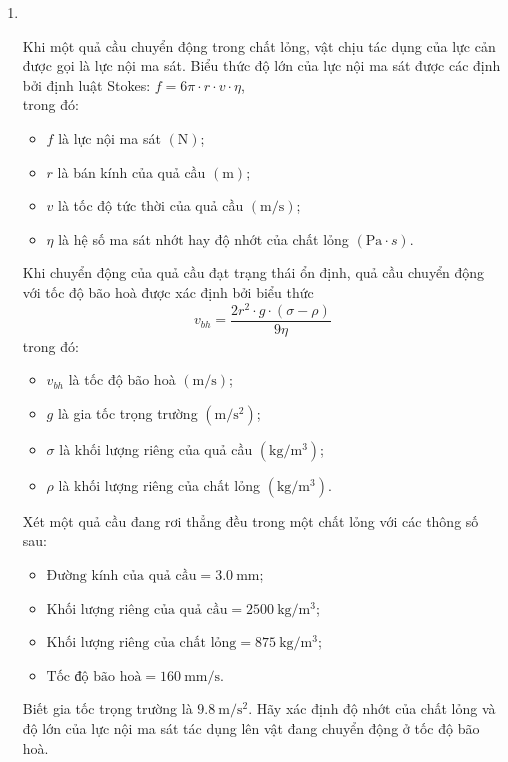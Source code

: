\begin{enumerate}[label=\bfseries Bài \arabic*:,leftmargin=1.5cm]
\item{}\\
{Khi một quả cầu chuyển động trong chất lỏng, vật chịu tác dụng của lực cản được gọi là lực nội ma sát. Biểu thức độ lớn của lực nội ma sát được các định bởi định luật Stokes: $f=6\pi \cdot r\cdot v\cdot\eta$,\\
	trong đó:
	\begin{itemize}
		\item $f$ là lực nội ma sát $\left(\si{\newton}\right)$;
		\item $r$ là bán kính của quả cầu $\left(\si{\meter}\right)$;
		\item $v$ là tốc độ tức thời của quả cầu $\left(\si{\meter/\second}\right)$;
		\item $\eta$ là hệ số ma sát nhớt hay độ nhớt của chất lỏng $\left(\si{\pascal\cdot s}\right)$.
	\end{itemize}
Khi chuyển động của quả cầu đạt trạng thái ổn định, quả cầu chuyển động với tốc độ bão hoà được xác định bởi biểu thức
$$v_{bh}=\dfrac{2r^2\cdot g\cdot\left(\sigma - \rho\right)}{9\eta}$$
trong đó:
\begin{itemize}
	\item $v_{bh}$ là tốc độ bão hoà $\left(\si{\meter/\second}\right)$;
	\item $g$ là gia tốc trọng trường $\left(\si{\meter/\second^2}\right)$;
	\item $\sigma$ là khối lượng riêng của quả cầu $\left(\si{\kilogram/\meter^3}\right)$;
	\item $\rho$ là khối lượng riêng của chất lỏng $\left(\si{\kilogram/\meter^3}\right)$.
\end{itemize}
Xét một quả cầu đang rơi thẳng đều trong một chất lỏng với các thông số sau:
\begin{itemize}
	\item $\text{Đường kính của quả cầu}=\SI{3.0}{\milli\meter}$;
	\item $\text{Khối lượng riêng của quả cầu}=\SI{2500}{\kilogram/\meter^3}$;
	\item $\text{Khối lượng riêng của chất lỏng}=\SI{875}{\kilogram/\meter^3}$;
	\item $\text{Tốc độ bão hoà}=\SI{160}{\milli\meter/\second}$.
\end{itemize}
Biết gia tốc trọng trường là $\SI{9.8}{\meter/\second^2}$. Hãy xác định độ nhớt của chất lỏng và độ lớn của lực nội ma sát tác dụng lên vật đang chuyển động ở tốc độ bão hoà.
}


\end{enumerate}